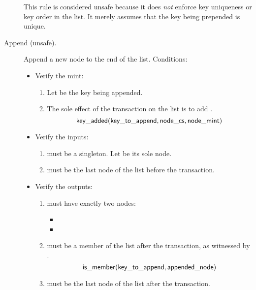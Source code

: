 \documentclass[../midgard.tex]{subfiles}
\begin{document}
\begin{description}
    This rule is considered unsafe because it does \emph{not} enforce key uniqueness or key order in the list. It merely assumes that the key being prepended is unique.

    \unorderedListWarning 

    \item[Append (unsafe).] Append a new node to the end of the list. Conditions:
        \begin{itemize}
            \item Verify the mint:
            \begin{enumerate}
                \item Let  be the key being appended.
                
                \item The sole effect of the transaction on the list is to add .
                    \begin{equation*}
                        \mathsf{key\_added}(\mathsf{key\_to\_append}, \mathsf{node\_cs}, \mathsf{node\_mint})
                    \end{equation*}
            \end{enumerate}
            
            \item Verify the inputs:
            \begin{enumerate}[resume]
                \item {} must be a singleton. Let  be its sole node.
                \item {} must be the last node of the list before the transaction.
            \end{enumerate}
            
            \item Verify the outputs:
            \begin{enumerate}[resume]
                \item {} must have exactly two nodes:
                    \begin{itemize}
                        \item {}
                        \item {}  
                    \end{itemize}
                \item {} must be a member of the list after the transaction, as witnessed by .  
                    \begin{equation*}
                        \mathsf{is\_member} (\mathsf{key\_to\_append}, \mathsf{appended\_node})
                    \end{equation*}
                \item {} must be the last node of the list after the transaction.
    

\end{enumerate}
\end{itemize}
\end{description}
\end{document}
